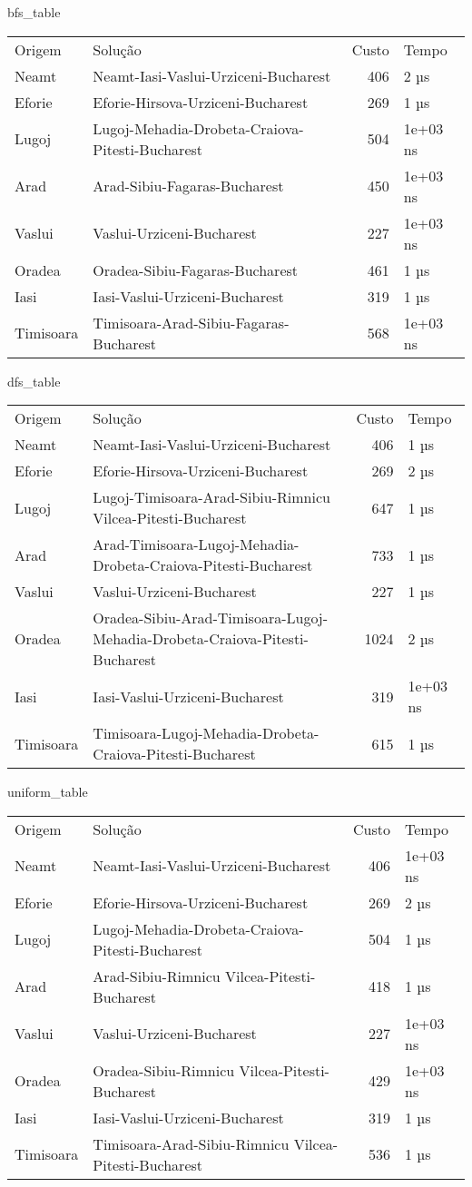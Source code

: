 bfs_table
\begin{tabular}{llrl}
Origem & Solução & Custo & Tempo \\
Neamt & Neamt-Iasi-Vaslui-Urziceni-Bucharest & 406 & 2 µs \\
Eforie & Eforie-Hirsova-Urziceni-Bucharest & 269 & 1 µs \\
Lugoj & Lugoj-Mehadia-Drobeta-Craiova-Pitesti-Bucharest & 504 & 1e+03 ns \\
Arad & Arad-Sibiu-Fagaras-Bucharest & 450 & 1e+03 ns \\
Vaslui & Vaslui-Urziceni-Bucharest & 227 & 1e+03 ns \\
Oradea & Oradea-Sibiu-Fagaras-Bucharest & 461 & 1 µs \\
Iasi & Iasi-Vaslui-Urziceni-Bucharest & 319 & 1 µs \\
Timisoara & Timisoara-Arad-Sibiu-Fagaras-Bucharest & 568 & 1e+03 ns \\
\end{tabular}

dfs_table
\begin{tabular}{llrl}
Origem & Solução & Custo & Tempo \\
Neamt & Neamt-Iasi-Vaslui-Urziceni-Bucharest & 406 & 1 µs \\
Eforie & Eforie-Hirsova-Urziceni-Bucharest & 269 & 2 µs \\
Lugoj & Lugoj-Timisoara-Arad-Sibiu-Rimnicu Vilcea-Pitesti-Bucharest & 647 & 1 µs \\
Arad & Arad-Timisoara-Lugoj-Mehadia-Drobeta-Craiova-Pitesti-Bucharest & 733 & 1 µs \\
Vaslui & Vaslui-Urziceni-Bucharest & 227 & 1 µs \\
Oradea & Oradea-Sibiu-Arad-Timisoara-Lugoj-Mehadia-Drobeta-Craiova-Pitesti-Bucharest & 1024 & 2 µs \\
Iasi & Iasi-Vaslui-Urziceni-Bucharest & 319 & 1e+03 ns \\
Timisoara & Timisoara-Lugoj-Mehadia-Drobeta-Craiova-Pitesti-Bucharest & 615 & 1 µs \\
\end{tabular}

uniform_table
\begin{tabular}{llrl}
Origem & Solução & Custo & Tempo \\
Neamt & Neamt-Iasi-Vaslui-Urziceni-Bucharest & 406 & 1e+03 ns \\
Eforie & Eforie-Hirsova-Urziceni-Bucharest & 269 & 2 µs \\
Lugoj & Lugoj-Mehadia-Drobeta-Craiova-Pitesti-Bucharest & 504 & 1 µs \\
Arad & Arad-Sibiu-Rimnicu Vilcea-Pitesti-Bucharest & 418 & 1 µs \\
Vaslui & Vaslui-Urziceni-Bucharest & 227 & 1e+03 ns \\
Oradea & Oradea-Sibiu-Rimnicu Vilcea-Pitesti-Bucharest & 429 & 1e+03 ns \\
Iasi & Iasi-Vaslui-Urziceni-Bucharest & 319 & 1 µs \\
Timisoara & Timisoara-Arad-Sibiu-Rimnicu Vilcea-Pitesti-Bucharest & 536 & 1 µs \\
\end{tabular}


